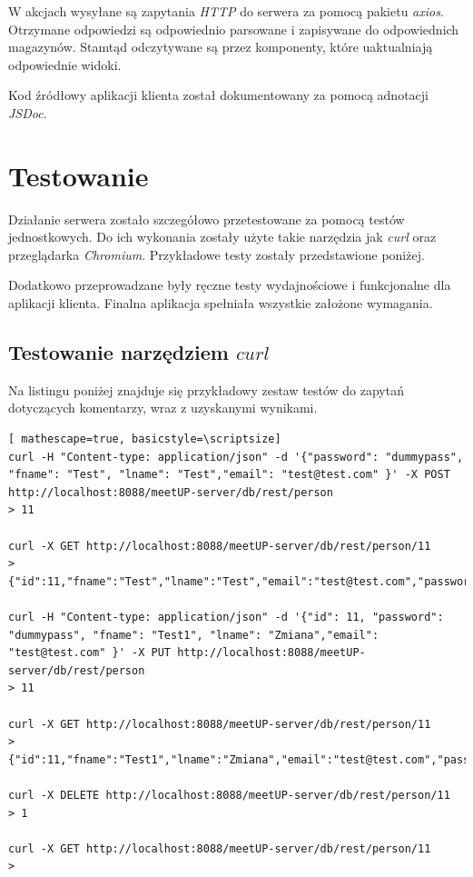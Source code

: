 \documentclass[12pt]{article}
\begin{document}
W akcjach wysyłane są zapytania \textit{HTTP} do serwera za pomocą pakietu \textit{axios}. Otrzymane odpowiedzi są odpowiednio parsowane i zapisywane do odpowiednich magazynów. Stamtąd odczytywane są przez komponenty, które uaktualniają odpowiednie widoki.

Kod źródłowy aplikacji klienta został dokumentowany za pomocą adnotacji \textit{JSDoc}.

\pagebreak
\section{Testowanie}

Działanie serwera zostało szczegółowo przetestowane za pomocą testów jednostkowych. Do ich wykonania zostały użyte takie narzędzia jak \textit{curl} oraz przeglądarka \textit{Chromium}. Przykładowe testy zostały przedstawione poniżej.

Dodatkowo przeprowadzane były ręczne testy wydajnościowe i funkcjonalne dla aplikacji klienta. Finalna aplikacja spełniała wszystkie założone wymagania.

\subsection{Testowanie narzędziem $curl$}
Na listingu poniżej znajduje się przykładowy zestaw testów do zapytań dotyczących komentarzy, wraz z uzyskanymi wynikami.
\begin{lstlisting}[ mathescape=true, basicstyle=\scriptsize]
curl -H "Content-type: application/json" -d '{"password": "dummypass", "fname": "Test", "lname": "Test","email": "test@test.com" }' -X POST http://localhost:8088/meetUP-server/db/rest/person
> 11

curl -X GET http://localhost:8088/meetUP-server/db/rest/person/11
> {"id":11,"fname":"Test","lname":"Test","email":"test@test.com","password":"dummypass"}

curl -H "Content-type: application/json" -d '{"id": 11, "password": "dummypass", "fname": "Test1", "lname": "Zmiana","email": "test@test.com" }' -X PUT http://localhost:8088/meetUP-server/db/rest/person
> 11

curl -X GET http://localhost:8088/meetUP-server/db/rest/person/11
> {"id":11,"fname":"Test1","lname":"Zmiana","email":"test@test.com","password":"dummypass"}

curl -X DELETE http://localhost:8088/meetUP-server/db/rest/person/11
> 1

curl -X GET http://localhost:8088/meetUP-server/db/rest/person/11
>
\end{lstlisting}
\end{document}
